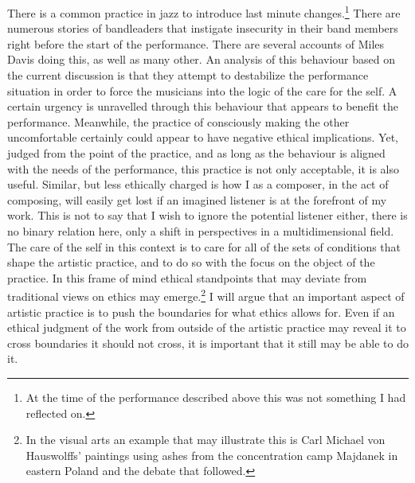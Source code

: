 \documentclass[11pt]{article}
\begin{document}
There is a common practice in jazz to introduce last minute changes.\footnote{At the time of the performance described above this was not something I had reflected on.} There are numerous stories of bandleaders that instigate insecurity in their band members right before the start of the performance. There are several accounts of Miles Davis doing this, as well as many other. An analysis of this behaviour based on the current discussion is that they attempt to destabilize the performance situation in order to force the musicians into the logic of the care for the self. A certain urgency is unravelled through this behaviour that appears to benefit the performance. Meanwhile, the practice of consciously making the other uncomfortable certainly could appear to have negative ethical implications. Yet, judged from the point of the practice, and as long as the behaviour is aligned with the needs of the performance, this practice is not only acceptable, it is also useful. Similar, but less ethically charged is how I as a composer, in the act of composing, will easily get lost if an imagined listener is at the forefront of my work. This is not to say that I wish to ignore the potential listener either, there is no binary relation here, only a shift in perspectives in a multidimensional field. The care of the self in this context is to care for all of the sets of conditions that shape the artistic practice, and to do so with the focus on the object of the practice. In this frame of mind ethical standpoints that may deviate from traditional views on ethics may emerge.\footnote{In the visual arts an example that may illustrate this is Carl Michael von Hauswolffs' paintings using ashes from the concentration camp Majdanek in eastern Poland and the debate that followed.} I will argue that an important aspect of artistic practice is to push the boundaries for what ethics allows for. Even if an ethical judgment of the work from outside of the artistic practice may reveal it to cross boundaries it should not cross, it is important that it still may be able to do it.
\end{document}
